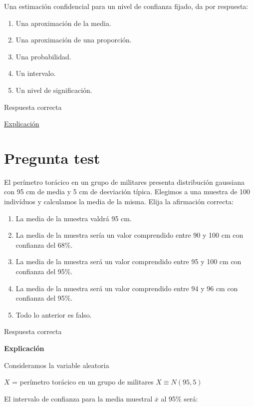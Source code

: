 \documentclass[
]{book}
\providecommand{\tightlist}{%
  \setlength{\itemsep}{0pt}\setlength{\parskip}{0pt}}
\begin{document}
Una estimación confidencial para un nivel de confianza fijado, da por respuesta:

\begin{enumerate}
\def\labelenumi{\alph{enumi})}
\tightlist
\item
  Una aproximación de la media.
\item
  Una aproximación de una proporción.
\item
  Una probabilidad.
\item
  Un intervalo.
\item
  Un nivel de significación.
\end{enumerate}

Respuesta correcta

\href{https://1fjmanzano.github.io/bioestadistica/estimacio\%CC\%81n-de-para\%CC\%81metros.-intervalos-de-confianza.html}{Explicación}

\hypertarget{pregunta-test-93}{%
\section{Pregunta test}\label{pregunta-test-93}}

El perímetro torácico en un grupo de militares presenta distribución gaussiana con 95 cm de media y 5 cm de desviación típica. Elegimos a una muestra de 100 indivíduos y calculamos la media de la misma. Elija la afirmación correcta:

\begin{enumerate}
\def\labelenumi{\alph{enumi})}
\tightlist
\item
  La media de la muestra valdrá 95 cm.
\item
  La media de la muestra sería un valor comprendido entre 90 y 100 cm con confianza del 68\%.
\item
  La media de la muestra será un valor comprendido entre 95 y 100 cm con confianza del 95\%.
\item
  La media de la muestra será un valor comprendido entre 94 y 96 cm con confianza del 95\%.
\item
  Todo lo anterior es falso.
\end{enumerate}

Respuesta correcta

\textbf{Explicación}

Consideramos la variable aleatoria

\(X\) = perímetro torácico en un grupo de militares \(X \equiv N(95, 5)\)

El intervalo de confianza para la media muestral \(\overline{x}\) al 95\% será:
\end{document}
